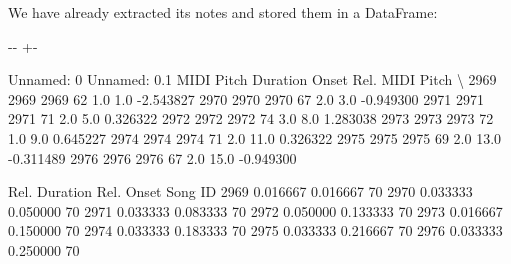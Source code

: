 \documentclass[letterpaper,10pt,english]{sphinxmanual}
\newlength\nbsphinxcodecellspacing
\begin{document}
We have already extracted its notes and stored them in a DataFrame:

{
\begin{sphinxVerbatim}[commandchars=\\\{\}]
\llap{\color{nbsphinxin}[69]:\,\hspace{\fboxrule}\hspace{\fboxsep}}\PYG{p}{[} \PYG{p}{[}\PYG{p}{]}  \PYG{p}{]}
\end{sphinxVerbatim}
}

{

\kern-\sphinxverbatimsmallskipamount\kern-\baselineskip
\kern+\FrameHeightAdjust\kern-\fboxrule
\vspace{\nbsphinxcodecellspacing}

\begin{sphinxVerbatim}[commandchars=\\\{\}]
\llap{\color{nbsphinxout}[69]:\,\hspace{\fboxrule}\hspace{\fboxsep}}      Unnamed: 0  Unnamed: 0.1  MIDI Pitch  Duration  Onset  Rel. MIDI Pitch  \textbackslash{}
2969        2969          2969          62       1.0    1.0        -2.543827
2970        2970          2970          67       2.0    3.0        -0.949300
2971        2971          2971          71       2.0    5.0         0.326322
2972        2972          2972          74       3.0    8.0         1.283038
2973        2973          2973          72       1.0    9.0         0.645227
2974        2974          2974          71       2.0   11.0         0.326322
2975        2975          2975          69       2.0   13.0        -0.311489
2976        2976          2976          67       2.0   15.0        -0.949300

      Rel. Duration  Rel. Onset  Song ID
2969       0.016667    0.016667       70
2970       0.033333    0.050000       70
2971       0.033333    0.083333       70
2972       0.050000    0.133333       70
2973       0.016667    0.150000       70
2974       0.033333    0.183333       70
2975       0.033333    0.216667       70
2976       0.033333    0.250000       70
\end{sphinxVerbatim}
}
\end{document}
